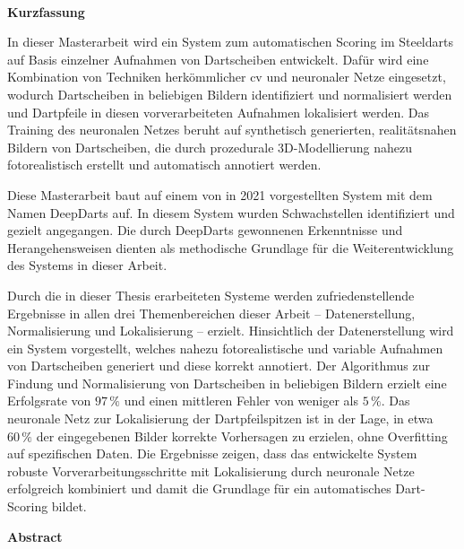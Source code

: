 
\mbox{~}
\newpage

\vspace*{2.17cm}

{\noindent\Huge\textbf{Kurzfassung}}

\vspace*{1.405cm}

\noindent In dieser Masterarbeit wird ein System zum automatischen Scoring im Steeldarts auf Basis einzelner Aufnahmen von Dartscheiben entwickelt. Dafür wird eine Kombination von Techniken herkömmlicher \ac{cv} und neuronaler Netze eingesetzt, wodurch Dartscheiben in beliebigen Bildern identifiziert und normalisiert werden und Dartpfeile in diesen vorverarbeiteten Aufnahmen lokalisiert werden. Das Training des neuronalen Netzes beruht auf synthetisch generierten, realitätsnahen Bildern von Dartscheiben, die durch prozedurale 3D-Modellierung nahezu fotorealistisch erstellt und automatisch annotiert werden.

Diese Masterarbeit baut auf einem von \citeauthor{deepdarts} in 2021 vorgestellten System mit dem Namen DeepDarts auf. In diesem System wurden Schwachstellen identifiziert und gezielt angegangen. Die durch DeepDarts gewonnenen Erkenntnisse und Herangehensweisen dienten als methodische Grundlage für die Weiterentwicklung des Systems in dieser Arbeit.

Durch die in dieser Thesis erarbeiteten Systeme werden zufriedenstellende Ergebnisse in allen drei Themenbereichen dieser Arbeit -- Datenerstellung, Normalisierung und Lokalisierung -- erzielt. Hinsichtlich der Datenerstellung wird ein System vorgestellt, welches nahezu fotorealistische und variable Aufnahmen von Dartscheiben generiert und diese korrekt annotiert. Der Algorithmus zur Findung und Normalisierung von Dartscheiben in beliebigen Bildern erzielt eine Erfolgsrate von $97\,\%$ und einen mittleren Fehler von weniger als $5\,\%$. Das neuronale Netz zur Lokalisierung der Dartpfeilspitzen ist in der Lage, in etwa $60\,\%$ der eingegebenen Bilder korrekte Vorhersagen zu erzielen, ohne Overfitting auf spezifischen Daten. Die Ergebnisse zeigen, dass das entwickelte System robuste Vorverarbeitungsschritte mit Lokalisierung durch neuronale Netze erfolgreich kombiniert und damit die Grundlage für ein automatisches Dart-Scoring bildet.

\newpage

\vspace*{2.17cm}

{\noindent\Huge\textbf{Abstract}}

